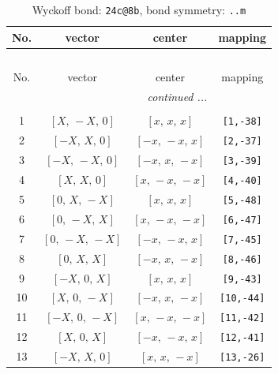 \documentclass[fleqn,8pt]{jsarticle}
\begin{document}
\begin{longtable}{cccc}
\caption{Wyckoff bond: {\tt 24c@8b}, bond symmetry: {\tt ..m}}
 \\
 \hline \hline
No. & vector & center & mapping \\ \hline \endfirsthead

\multicolumn{3}{l}{\tablename\ \thetable{}} \\
 \hline \hline
No. & vector & center & mapping \\ \hline \endhead

 \hline \hline
\multicolumn{3}{r}{\footnotesize\it continued ...} \\ \endfoot

 \hline \hline
\multicolumn{3}{r}{} \\ \endlastfoot

1 & $\left[ X,\, - X,\, 0 \right]$ & $\left[ x,\, x,\, x \right]$ & {\tt [1,-38]} \\ \hline
2 & $\left[ - X,\, X,\, 0 \right]$ & $\left[ - x,\, - x,\, x \right]$ & {\tt [2,-37]} \\ \hline
3 & $\left[ - X,\, - X,\, 0 \right]$ & $\left[ - x,\, x,\, - x \right]$ & {\tt [3,-39]} \\ \hline
4 & $\left[ X,\, X,\, 0 \right]$ & $\left[ x,\, - x,\, - x \right]$ & {\tt [4,-40]} \\ \hline
5 & $\left[ 0,\, X,\, - X \right]$ & $\left[ x,\, x,\, x \right]$ & {\tt [5,-48]} \\ \hline
6 & $\left[ 0,\, - X,\, X \right]$ & $\left[ x,\, - x,\, - x \right]$ & {\tt [6,-47]} \\ \hline
7 & $\left[ 0,\, - X,\, - X \right]$ & $\left[ - x,\, - x,\, x \right]$ & {\tt [7,-45]} \\ \hline
8 & $\left[ 0,\, X,\, X \right]$ & $\left[ - x,\, x,\, - x \right]$ & {\tt [8,-46]} \\ \hline
9 & $\left[ - X,\, 0,\, X \right]$ & $\left[ x,\, x,\, x \right]$ & {\tt [9,-43]} \\ \hline
10 & $\left[ X,\, 0,\, - X \right]$ & $\left[ - x,\, x,\, - x \right]$ & {\tt [10,-44]} \\ \hline
11 & $\left[ - X,\, 0,\, - X \right]$ & $\left[ x,\, - x,\, - x \right]$ & {\tt [11,-42]} \\ \hline
12 & $\left[ X,\, 0,\, X \right]$ & $\left[ - x,\, - x,\, x \right]$ & {\tt [12,-41]} \\ \hline
13 & $\left[ - X,\, X,\, 0 \right]$ & $\left[ x,\, x,\, - x \right]$ & {\tt [13,-26]} \\ \hline

\end{longtable}
\end{document}
